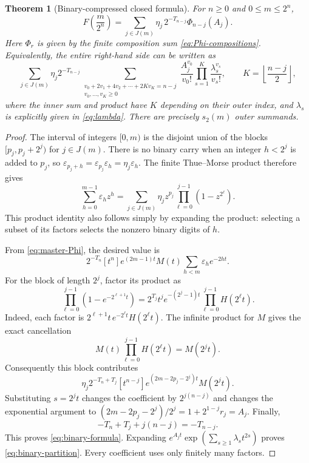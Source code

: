 \documentclass[11pt,a4paper]{article}
\numberwithin{equation}{section}
\newtheorem{theorem}{Theorem}[section]
\theoremstyle{definition}
\theoremstyle{remark}
\newcommand{\eps}{\varepsilon}
\newcommand{\coeff}[2]{[#1^{#2}]}
\newcommand{\floor}[1]{\left\lfloor #1\right\rfloor}
\newcommand{\bits}{s_2}
\begin{document}
\begin{theorem}[Binary-compressed closed formula]
\label{thm:binary}
For $n\ge0$ and $0\le m\le2^n$,
\begin{equation}
 \boxed{\displaystyle
 F\!\left(\frac m{2^n}\right)
 =\sum_{j\in J(m)}\eta_j\,2^{-T_{n-j}}\Phi_{n-j}(A_j).}
 \label{eq:binary-formula}
\end{equation}
Here $\Phi_r$ is given by the finite composition sum \cref{eq:Phi-compositions}. Equivalently, the entire right-hand side can be written as
\begin{equation}
 \sum_{j\in J(m)}\eta_j2^{-T_{n-j}}
 \sum_{\substack{v_0+2v_1+4v_2+\cdots+2Kv_K=n-j\\v_0,\ldots,v_K\ge0}}
 \frac{A_j^{v_0}}{v_0!}
 \prod_{s=1}^{K}\frac{\lambda_s^{v_s}}{v_s!},
 \qquad K=\floor{\frac{n-j}{2}},
 \label{eq:binary-partition}
\end{equation}
where the inner sum and product have $K$ depending on their outer index, and $\lambda_s$ is explicitly given in \cref{eq:lambda}. There are precisely $\bits(m)$ outer summands.
\end{theorem}

\begin{proof}
The interval of integers $[0,m)$ is the disjoint union of the blocks
$[p_j,p_j+2^j)$ for $j\in J(m)$. There is no binary carry when an integer $h<2^j$ is added to $p_j$, so $\eps_{p_j+h}=\eps_{p_j}\eps_h=\eta_j\eps_h$. The finite Thue--Morse product therefore gives
\begin{equation}
 \sum_{h=0}^{m-1}\eps_h z^h
 =\sum_{j\in J(m)}\eta_j z^{p_j}
       \prod_{\ell=0}^{j-1}(1-z^{2^\ell}).
 \label{eq:prefix-binary-product}
\end{equation}
This product identity also follows simply by expanding the product: selecting a subset of its factors selects the nonzero binary digits of $h$.

From \cref{eq:master-Phi}, the desired value is
\[
 2^{-T_n}\coeff{t}{n}
 e^{(2m-1)t}M(t)\sum_{h<m}\eps_h e^{-2ht}.
\]
For the block of length $2^j$, factor its product as
\begin{equation}
 \prod_{\ell=0}^{j-1}(1-e^{-2^{\ell+1}t})
 =2^{T_j}t^j e^{-(2^j-1)t}
       \prod_{\ell=0}^{j-1}H(2^\ell t).
 \label{eq:binary-H-product}
\end{equation}
Indeed, each factor is $2^{\ell+1}t\,e^{-2^\ell t}H(2^\ell t)$. The infinite product for $M$ gives the exact cancellation
\[
 M(t)\prod_{\ell=0}^{j-1}H(2^\ell t)=M(2^jt).
\]
Consequently this block contributes
\[
 \eta_j2^{-T_n+T_j}
 \coeff{t}{n-j} e^{(2m-2p_j-2^j)t}M(2^jt).
\]
Substituting $s=2^jt$ changes the coefficient by $2^{j(n-j)}$ and changes the exponential argument to
$(2m-2p_j-2^j)/2^j=1+2^{1-j}r_j=A_j$.
Finally,
\[
 -T_n+T_j+j(n-j)=-T_{n-j}.
\]
This proves \cref{eq:binary-formula}. Expanding $e^{A_jt}\exp(\sum_{s\ge1}\lambda_st^{2s})$ proves \cref{eq:binary-partition}. Every coefficient uses only finitely many factors.
\end{proof}
\end{document}
